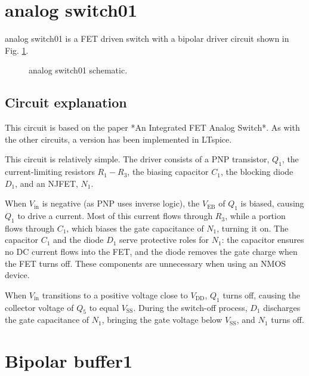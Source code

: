 \documentclass[12pt]{article}
\begin{document}
\newpage


\section{analog switch01}



analog switch01 is a FET driven switch with a bipolar driver circuit shown in Fig. \ref{analogswitch01}. 

\begin{figure}[H]
        \centering
        
        \caption{analog switch01 schematic.}
        \label{analogswitch01}
\end{figure}

\subsection{Circuit explanation}
This circuit is based on the paper *An Integrated FET Analog Switch*.  
As with the other circuits, a version has been implemented in LTspice.  

This circuit is relatively simple. The driver consists of a PNP transistor, $Q_1$, the current-limiting resistors $R_1 - R_3$, the biasing capacitor $C_1$, the blocking diode $D_1$, and an NJFET, $N_1$.  

When $V_{\text{in}}$ is negative (as PNP uses inverse logic), the $V_{\text{EB}}$ of $Q_1$ is biased, causing $Q_1$ to drive a current. Most of this current flows through $R_3$, while a portion flows through $C_1$, which biases the gate capacitance of $N_1$, turning it on. The capacitor $C_1$ and the diode $D_1$ serve protective roles for $N_1$: the capacitor ensures no DC current flows into the FET, and the diode removes the gate charge when the FET turns off. These components are unnecessary when using an NMOS device.  

When $V_{\text{in}}$ transitions to a positive voltage close to $V_{\text{DD}}$, $Q_1$ turns off, causing the collector voltage of $Q_5$ to equal $V_{\text{SS}}$. During the switch-off process, $D_1$ discharges the gate capacitance of $N_1$, bringing the gate voltage below $V_{\text{SS}}$, and $N_1$ turns off.  


\newpage
\section{Bipolar buffer1}
\end{document}

